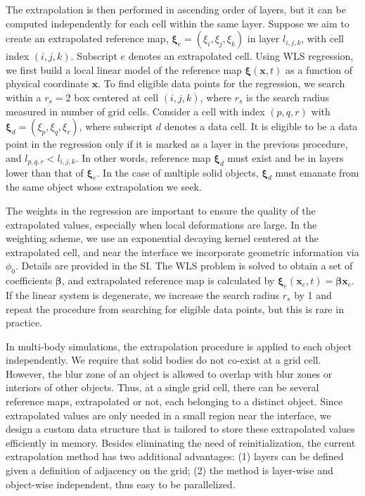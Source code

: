 \documentclass[times, 10pt]{article}
\renewcommand{\vec}[1]{\mathbf{#1}}
\newcommand{\vx}{\vec{x}}
\newcommand{\vxi}{\boldsymbol\xi}
\newcommand{\vbeta}{\boldsymbol\beta}
\begin{document}
\begin{multicols}{2}
The extrapolation is then performed in ascending order of layers, but it can be computed independently for each cell within the same layer.
Suppose we aim to create an extrapolated reference map, $\vxi_e = (\xi_i, \xi_j, \xi_k)$ in layer $l_{i,j,k}$,
with cell index $(i,j,k)$. Subscript $e$ denotes an extrapolated cell.
Using WLS regression, we first build a local linear model of the reference map $\vxi(\vx, t)$ as a function of physical coordinate $\vx$.
To find eligible data points for the regression, we search within a $r_s=2$ box centered at cell $(i,j,k)$, where $r_s$ is the search radius measured in number of grid cells.
%
Consider a cell with index $(p,q,r)$ with $\vxi_d = (\xi_p, \xi_q, \xi_r)$, where subscript $d$ denotes a data cell.
It is eligible to be a data point in the regression only if it is marked as a layer in the previous procedure, and $l_{p,q,r} < l_{i,j,k}$.
In other words, reference map $\vxi_d$ must exist and be in layers lower than that of $\vxi_e$.
In the case of multiple solid objects, $\vxi_d$ must emanate from the same object whose extrapolation we seek.

The weights in the regression are important to ensure the quality of the extrapolated values,
especially when local deformations are large.
In the weighting scheme, we use an exponential decaying kernel centered at the extrapolated cell,
and near the interface we incorporate geometric information via $\phi_0$.
Details are provided in the SI.
The WLS problem is solved to obtain a set of coefficients $\vbeta$, and extrapolated reference map is calculated by $\vxi_e(\vx_e, t)=\vbeta \vx_e$.
If the linear system is degenerate, we increase the search radius $r_s$ by 1 and repeat the procedure from searching for eligible data points, but this is rare in practice.

In multi-body simulations, the extrapolation procedure is applied to each object independently.
We require that solid bodies do not co-exist at a grid cell.
However, the blur zone of an object is allowed to overlap with blur zones or interiors of other objects.
Thus, at a single grid cell, there can be several reference maps, extrapolated or not, each belonging to a distinct object.
Since extrapolated values are only needed in a small region near the interface, we design a custom data structure that is tailored to store these extrapolated values efficiently in memory.
Besides eliminating the need of reinitialization, the current extrapolation method has two additional advantages:
(1) layers can be defined given a definition of adjacency on the grid;
(2) the method is layer-wise and object-wise independent, thus easy to be parallelized.


\end{multicols}
\end{document}

